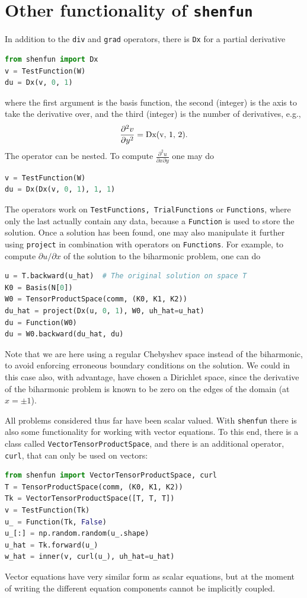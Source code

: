 \documentclass[%
oneside,                 %
final,                   %
10pt]{article}
\theoremstyle{definition}
\begin{document}
\section{Other functionality of \texttt{shenfun} }
\label{sec:extended}
In addition to the \texttt{div} and \texttt{grad} operators, there is \texttt{Dx} for a partial derivative
\begin{lstlisting}[language=Python,style=yellow2_fb]
from shenfun import Dx
v = TestFunction(W)
du = Dx(v, 0, 1)
\end{lstlisting}
where the first argument is the basis function, the second (integer) is the axis to take the derivative over, and the third (integer) is the number of derivatives, e.g.,
\begin{equation}
\frac{\partial^2 v}{\partial y^2} = \text{Dx(v, 1, 2)}. \notag
\end{equation}
The operator can be nested. To compute $\frac{\partial^2 u}{\partial x  \partial y} $ one may do
\begin{lstlisting}[language=Python,style=yellow2_fb]
v = TestFunction(W)
du = Dx(Dx(v, 0, 1), 1, 1)
\end{lstlisting}
The operators work on \texttt{TestFunctions, TrialFunctions} or \texttt{Functions}, where only the last actually contain any data, because a \texttt{Function} is used to store the solution. Once a solution has been found, one may also manipulate it further using \texttt{project} in combination with operators on \texttt{Functions}. For example, to compute $\partial u / \partial x$ of the solution to the biharmonic problem, one can do
\begin{lstlisting}[language=Python,style=yellow2_fb]
u = T.backward(u_hat)  # The original solution on space T
K0 = Basis(N[0])
W0 = TensorProductSpace(comm, (K0, K1, K2))
du_hat = project(Dx(u, 0, 1), W0, uh_hat=u_hat)
du = Function(W0)
du = W0.backward(du_hat, du)
\end{lstlisting}
Note that we are here using a regular Chebyshev space instead of the biharmonic, to avoid enforcing erroneous boundary conditions on the solution. We could in this case also, with advantage, have chosen a Dirichlet space, since the derivative of the biharmonic problem is known to be zero on the edges of the domain (at $x=\pm 1$).

All problems considered thus far have been scalar valued. With \texttt{shenfun} there is also some functionality for working with vector equations. To this end, there is a class called \texttt{VectorTensorProductSpace}, and there is an additional operator, \texttt{curl}, that can only be used on vectors:
\begin{lstlisting}[language=Python,style=yellow2_fb]
from shenfun import VectorTensorProductSpace, curl
T = TensorProductSpace(comm, (K0, K1, K2))
Tk = VectorTensorProductSpace([T, T, T])
v = TestFunction(Tk)
u_ = Function(Tk, False)
u_[:] = np.random.random(u_.shape)
u_hat = Tk.forward(u_)
w_hat = inner(v, curl(u_), uh_hat=u_hat)
\end{lstlisting}
Vector equations have very similar form as scalar equations, but at the moment of writing the different equation components cannot be implicitly coupled.
\end{document}
